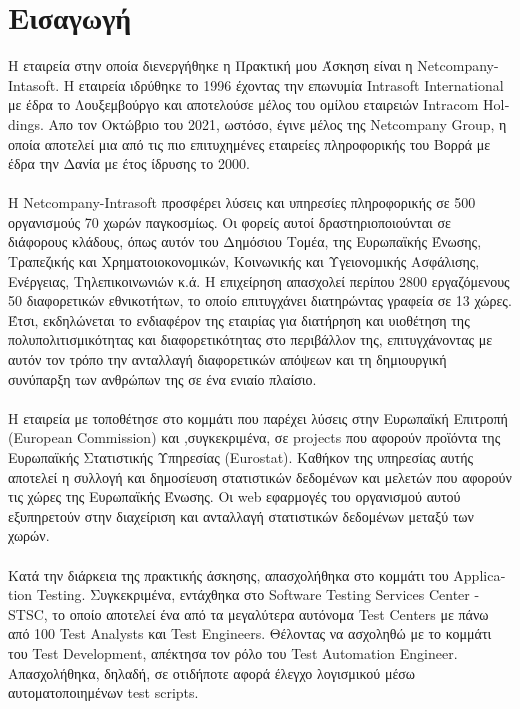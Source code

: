 \chapter*{Εισαγωγή}

Η εταιρεία στην οποία διενεργήθηκε η Πρακτική μου Άσκηση είναι η \textlatin{Netcompany-Intasoft}. Η εταιρεία ιδρύθηκε το 1996 έχοντας την επωνυμία \textlatin{Intrasoft International} με έδρα το Λουξεμβούργο και αποτελούσε μέλος του ομίλου εταιρειών \textlatin{Intracom Holdings}. Απο τον Οκτώβριο του 2021, ωστόσο, έγινε μέλος της Netcompany Group, η οποία αποτελεί μια από τις πιο επιτυχημένες εταιρείες πληροφορικής του Βορρά με έδρα την Δανία με έτος ίδρυσης το 2000.
\\ \\
Η \textlatin{Netcompany-Intrasoft} προσφέρει λύσεις και υπηρεσίες πληροφορικής σε 500 οργανισμούς 70 χωρών παγκοσμίως. Οι φορείς αυτοί δραστηριοποιούνται σε διάφορους κλάδους, όπως αυτόν του Δημόσιου Τομέα, της Ευρωπαϊκής Ένωσης, Τραπεζικής και Χρηματοιοκονομικών, Κοινωνικής και Υγειονομικής Ασφάλισης, Ενέργειας, Τηλεπικοινωνιών κ.ά. Η επιχείρηση απασχολεί περίπου 2800 εργαζόμενους 50 διαφορετικών εθνικοτήτων, το οποίο επιτυγχάνει διατηρώντας γραφεία σε 13 χώρες. Έτσι, εκδηλώνεται το ενδιαφέρον της εταιρίας για διατήρηση και υιοθέτηση της πολυπολιτισμικότητας και διαφορετικότητας στο περιβάλλον της, επιτυγχάνοντας με αυτόν τον τρόπο την ανταλλαγή διαφορετικών απόψεων και τη δημιουργική συνύπαρξη των ανθρώπων της σε ένα ενιαίο πλαίσιο.
\\ \\
Η εταιρεία με τοποθέτησε στο κομμάτι που παρέχει λύσεις στην Ευρωπαϊκή Επιτροπή (\textlatin{European Commission}) και ,συγκεκριμένα, σε \textlatin{projects} που αφορούν προϊόντα της Ευρωπαϊκής Στατιστικής Υπηρεσίας (\textlatin{Eurostat}). Καθήκον της υπηρεσίας αυτής αποτελεί η συλλογή και δημοσίευση στατιστικών δεδομένων και μελετών που αφορούν τις χώρες της Ευρωπαϊκής Ένωσης. Οι \textlatin{web} εφαρμογές του οργανισμού αυτού εξυπηρετούν στην διαχείριση και ανταλλαγή στατιστικών δεδομένων μεταξύ των χωρών.
\\ \\
    Κατά την διάρκεια της πρακτικής άσκησης, απασχολήθηκα στο κομμάτι του \textlatin{Application Testing}. Συγκεκριμένα, εντάχθηκα στο \textlatin{Software Testing Services Center - STSC}, το οποίο αποτελεί ένα από τα μεγαλύτερα αυτόνομα \textlatin{Test Centers} με πάνω από 100 \textlatin{Test Analysts} και \textlatin{Test Engineers}. Θέλοντας να ασχοληθώ με το κομμάτι του \textlatin{Test Development}, απέκτησα τον ρόλο του \textlatin{Test Automation Engineer}. Απασχολήθηκα, δηλαδή, σε οτιδήποτε αφορά έλεγχο λογισμικού μέσω αυτοματοποιημένων \textlatin{test scripts}.